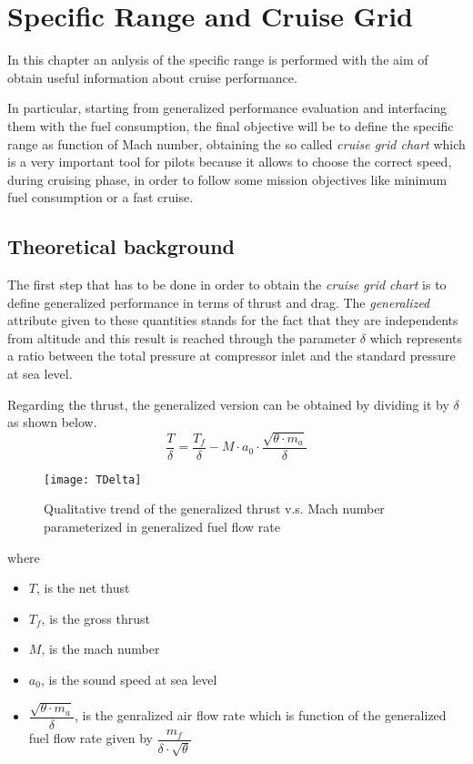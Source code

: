 \chapter{Specific Range and Cruise Grid}
In this chapter an anlysis of the specific range is performed with the aim of obtain useful information about cruise performance. 

In particular, starting from generalized performance evaluation and interfacing them with the fuel consumption, the final objective will be to define the specific range as function of Mach number, obtaining the so called \emph{cruise grid chart} which is a very important tool for pilots because it allows to choose the correct speed, during cruising phase, in order to follow some mission objectives like minimum fuel consumption or a fast cruise.

\section{Theoretical background}
The first step that has to be done in order to obtain the \emph{cruise grid chart} is to define generalized performance in terms of thrust and drag. The \emph{generalized} attribute given to these quantities stands for the fact that they are independents from altitude and this result is reached through the parameter $\delta$ which represents a ratio between the total pressure at compressor inlet and  the standard pressure at sea level. 

\bigskip
\noindent
Regarding the thrust, the generalized version can be obtained by dividing it by $\delta$ as shown below.
\begin{equation}
\frac{T}{\delta}=\frac{T_{f}}{\delta}-M\cdot a_{0}\cdot \frac{\sqrt{\theta \cdot m_{a}}}{\delta}
\label{eqn:Equation1}
\end{equation}

\begin{figure}[!ht]
\centering
\texttt{[image: TDelta]}
\caption{Qualitative trend of  the generalized thrust v.s. Mach number parameterized in generalized fuel flow rate}
\label{fig:Figure1}
\end{figure}

\noindent
where

\begin{itemize}
\item $T$, is the net thust
\item $T_{f}$, is the gross thrust
\item $M$, is the mach number
\item $a_{0}$, is the sound speed at sea level
\item $\dfrac{\sqrt{\theta \cdot m_{a}}}{\delta}$, is the genralized air flow rate which is function of the generalized fuel flow rate given by $\dfrac{m_{f}}{\delta \cdot \sqrt{\theta}}$
\end{itemize}

